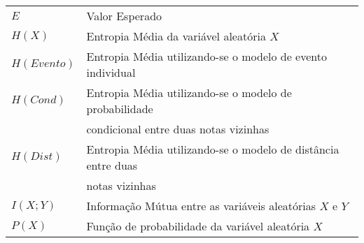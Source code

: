 \begin{longtable}{ll}

$E$ & Valor Esperado\\
$H(X)$ & Entropia Média da variável aleatória $X$\\
$H(Evento)$ & Entropia Média utilizando-se o modelo de evento individual\\
$H(Cond)$ & Entropia Média utilizando-se o modelo de probabilidade\\ & condicional entre duas notas vizinhas\\
$H(Dist)$ & Entropia Média utilizando-se o modelo de distância entre duas\\ & notas vizinhas\\
$I(X;Y)$ & Informação Mútua entre as variáveis aleatórias $X$ e $Y$\\
$P(X)$ & Função de probabilidade da variável aleatória $X$\\

\end{longtable}

